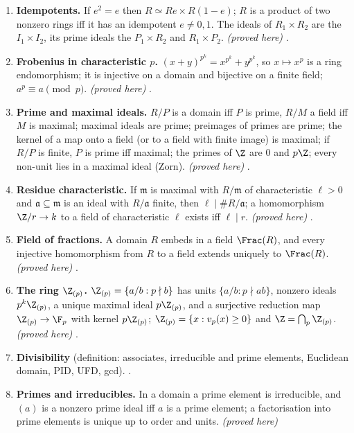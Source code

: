 \begin{enumerate}[label=\textbf{\thechapter.\arabic*}]
\item \textbf{Idempotents.} If $e^2=e$ then $R\simeq Re\times R(1-e)$; $R$ is a product of two nonzero rings iff it has an
idempotent $e\ne0,1$. The ideals of $R_1\times R_2$ are the $I_1\times I_2$, its prime ideals the $P_1\times R_2$ and $R_1\times P_2$.
\emph{(proved here)} .
\item \textbf{Frobenius in characteristic $p$.} $(x+y)^{p^k}=x^{p^k}+y^{p^k}$, so $x\mapsto x^p$ is a ring endomorphism; it is
injective on a domain and bijective on a finite field; $a^p\equiv a\pmod p$. \emph{(proved here)} .
\item \textbf{Prime and maximal ideals.} $R/P$ is a domain iff $P$ is prime, $R/M$ a field iff $M$ is maximal; maximal ideals are
prime; preimages of primes are prime; the kernel of a map onto a field (or to a field with finite image) is maximal; if $R/P$ is
finite, $P$ is prime iff maximal; the primes of $\Z$ are $0$ and $p\Z$; every non-unit lies in a maximal ideal (Zorn).
\emph{(proved here)} .
\item \textbf{Residue characteristic.} If $\mathfrak m$ is maximal with $R/\mathfrak m$ of characteristic $\ell>0$ and $\mathfrak a\subseteq\mathfrak m$ is an ideal with
$R/\mathfrak a$ finite, then $\ell\mid\#R/\mathfrak a$; a homomorphism $\Z/r\to k$ to a field of characteristic $\ell$ exists iff $\ell\mid r$.
\emph{(proved here)} .
\item \textbf{Field of fractions.} A domain $R$ embeds in a field $\Frac(R)$, and every injective homomorphism from $R$ to a field
extends uniquely to $\Frac(R)$. \emph{(proved here)} .
\item \textbf{The ring $\Z_{(p)}$.} $\Z_{(p)}=\{a/b:p\nmid b\}$ has units $\{a/b:p\nmid ab\}$, nonzero ideals $p^k\Z_{(p)}$, a unique maximal
ideal $p\Z_{(p)}$, and a surjective reduction map $\Z_{(p)}\to\F_p$ with kernel $p\Z_{(p)}$; $\Z_{(p)}=\{x:v_p(x)\ge0\}$ and
$\Z=\bigcap_p\Z_{(p)}$. \emph{(proved here)} .
\item \textbf{Divisibility} (definition: associates, irreducible and prime elements, Euclidean domain, PID, UFD, gcd).
.
\item \textbf{Primes and irreducibles.} In a domain a prime element is irreducible, and $(a)$ is a nonzero prime ideal iff $a$
is a prime element; a factorisation into prime elements is unique up to order and units. \emph{(proved here)}

\end{enumerate}
